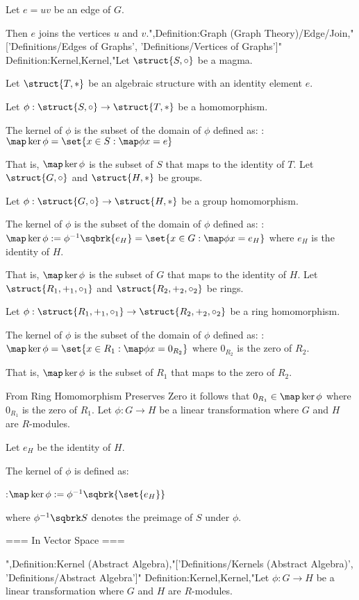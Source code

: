 Let $e = u v$ be an edge of $G$.


Then $e$ joins the vertices $u$ and $v$.",Definition:Graph (Graph Theory)/Edge/Join,"['Definitions/Edges of Graphs', 'Definitions/Vertices of Graphs']"
Definition:Kernel,Kernel,"Let $\struct {S, \circ}$ be a magma.

Let $\struct {T, *}$ be an algebraic structure with an identity element $e$.

Let $\phi: \struct {S, \circ} \to \struct {T, *}$ be a homomorphism.


The kernel of $\phi$ is the subset of the domain of $\phi$ defined as:
:$\map \ker \phi = \set {x \in S: \map \phi x = e}$


That is, $\map \ker \phi$ is the subset of $S$ that maps to the identity of $T$.
Let $\struct {G, \circ}$ and $\struct {H, *}$ be groups.

Let $\phi: \struct {G, \circ} \to \struct {H, *}$ be a group homomorphism.


The kernel of $\phi$ is the subset of the domain of $\phi$ defined as:
:$\map \ker \phi := \phi^{-1} \sqbrk {e_H} = \set {x \in G: \map \phi x = e_H}$
where $e_H$ is the identity of $H$.


That is, $\map \ker \phi$ is the subset of $G$ that maps to the identity of $H$.
Let $\struct {R_1, +_1, \circ_1}$ and $\struct {R_2, +_2, \circ_2}$ be rings.

Let $\phi: \struct {R_1, +_1, \circ_1} \to \struct {R_2, +_2, \circ_2}$ be a ring homomorphism.


The kernel of $\phi$ is the subset of the domain of $\phi$ defined as:
:$\map \ker \phi = \set {x \in R_1: \map \phi x = 0_{R_2} }$
where $0_{R_2}$ is the zero of $R_2$.


That is, $\map \ker \phi$ is the subset of $R_1$ that maps to the zero of $R_2$.


From Ring Homomorphism Preserves Zero it follows that $0_{R_1} \in \map \ker \phi$ where $0_{R_1}$ is the zero of $R_1$.
Let $\phi: G \to H$ be a linear transformation where $G$ and $H$ are $R$-modules.

Let $e_H$ be the identity of $H$.


The kernel of $\phi$ is defined as:

:$\map \ker \phi := \phi^{-1} \sqbrk {\set {e_H} }$

where $\phi^{-1} \sqbrk S$ denotes the preimage of $S$ under $\phi$.


=== In Vector Space ===

",Definition:Kernel (Abstract Algebra),"['Definitions/Kernels (Abstract Algebra)', 'Definitions/Abstract Algebra']"
Definition:Kernel,Kernel,"Let $\phi: G \to H$ be a linear transformation where $G$ and $H$ are $R$-modules.

